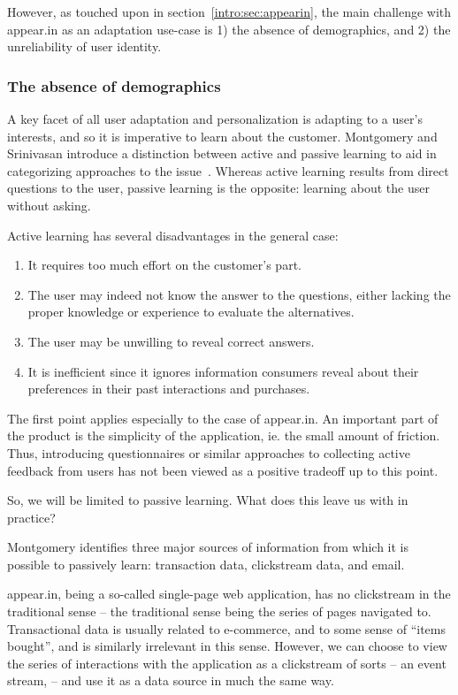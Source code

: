 However, as touched upon in section~\ref{intro:sec:appearin}, the main challenge with appear.in as an adaptation use-case is 1) the absence of demographics, and 2) the unreliability of user identity.

\subsubsection{The absence of demographics}

A key facet of all user adaptation and personalization is adapting to a user's interests, and so it is imperative to learn about the customer. Montgomery and Srinivasan introduce a distinction between active and passive learning to aid in categorizing approaches to the issue~\cite{Montgomery2002}. Whereas active learning results from direct questions to the user, passive learning is the opposite: learning about the user without asking.

Active learning has several disadvantages in the general case:

\begin{enumerate}
  \item It requires too much effort on the customer's part.
  \item The user may indeed not know the answer to the questions, either lacking the proper knowledge or experience to evaluate the alternatives.
  \item The user may be unwilling to reveal correct answers.
  \item It is inefficient since it ignores information consumers reveal about their preferences in their past interactions and purchases.
\end{enumerate}

The first point applies especially to the case of appear.in. An important part of the product is the simplicity of the application, ie. the small amount of friction. Thus, introducing questionnaires or similar approaches to collecting active feedback from users has not been viewed as a positive tradeoff up to this point.

So, we will be limited to passive learning. What does this leave us with in practice?

Montgomery identifies three major sources of information from which it is possible to passively learn: transaction data, clickstream data, and email.

appear.in, being a so-called single-page web application, has no clickstream in the traditional sense -- the traditional sense being the series of pages navigated to. Transactional data is usually related to e-commerce, and to some sense of ``items bought'', and is similarly irrelevant in this sense. However, we can choose to view the series of interactions with the application as a clickstream of sorts -- an event stream, -- and use it as a data source in much the same way.

